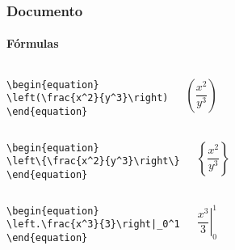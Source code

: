 \begin{frame}[fragile]
\frametitle{Documento}
\framesubtitle{Fórmulas}
  \scriptsize
  \begin{columns}[c]
  \begin{verbatim}
\begin{equation}
\left(\frac{x^2}{y^3}\right)
\end{equation}
  \end{verbatim}
  \begin{fmpage}{\textwidth}
\begin{equation}
\left(\frac{x^2}{y^3}\right)
\end{equation}
  \end{fmpage}
  \end{columns}


  \begin{columns}[c]
  \begin{verbatim}
\begin{equation}
\left\{\frac{x^2}{y^3}\right\}
\end{equation}
  \end{verbatim}
  \begin{fmpage}{\textwidth}
\begin{equation}
\left\{\frac{x^2}{y^3}\right\}
\end{equation}
  \end{fmpage}
  \end{columns}

  \begin{columns}[c]
  \begin{verbatim}
\begin{equation}
\left.\frac{x^3}{3}\right|_0^1
\end{equation}
  \end{verbatim}
  \begin{fmpage}{\textwidth}
\begin{equation}
\left.\frac{x^3}{3}\right|_0^1
\end{equation}
  \end{fmpage}
  \end{columns}
\end{frame}


